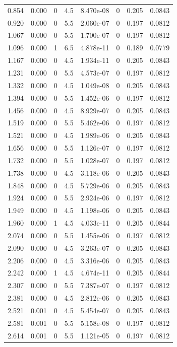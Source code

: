 \documentclass[preview]{standalone}
\begin{document}
{{\begin{tabular}{L{1.2cm}C{1.2cm} C{0.3cm}C{0.5cm} C{1.4cm}C{1.4cm} C{1.4cm}C{1.4cm}}
  0.854  &  0.000  & 0     & 4.5 &  8.470e-08  & 0  & 0.205 &  0.0843   \\ 
  0.920  &  0.000  & 0     & 5.5 &  2.060e-07  & 0  & 0.197 &  0.0812   \\ 
  1.067  &  0.000  & 0     & 5.5 &  1.700e-07  & 0  & 0.197 &  0.0812   \\ 
  1.096  &  0.000  & 1     & 6.5 &  4.878e-11  & 0  & 0.189 &  0.0779   \\ 
  1.167  &  0.000  & 0     & 4.5 &  1.934e-11  & 0  & 0.205 &  0.0843   \\ 
  1.231  &  0.000  & 0     & 5.5 &  4.573e-07  & 0  & 0.197 &  0.0812   \\ 
  1.332  &  0.000  & 0     & 4.5 &  1.049e-08  & 0  & 0.205 &  0.0843   \\ 
  1.394  &  0.000  & 0     & 5.5 &  1.452e-06  & 0  & 0.197 &  0.0812   \\ 
  1.456  &  0.000  & 0     & 4.5 &  8.929e-07  & 0  & 0.205 &  0.0843   \\ 
  1.519  &  0.000  & 0     & 5.5 &  5.462e-06  & 0  & 0.197 &  0.0812   \\ 
  1.521  &  0.000  & 0     & 4.5 &  1.989e-06  & 0  & 0.205 &  0.0843   \\ 
  1.656  &  0.000  & 0     & 5.5 &  1.126e-07  & 0  & 0.197 &  0.0812   \\ 
  1.732  &  0.000  & 0     & 5.5 &  1.028e-07  & 0  & 0.197 &  0.0812   \\ 
  1.738  &  0.000  & 0     & 4.5 &  3.118e-06  & 0  & 0.205 &  0.0843   \\ 
  1.848  &  0.000  & 0     & 4.5 &  5.729e-06  & 0  & 0.205 &  0.0843   \\ 
  1.924  &  0.000  & 0     & 5.5 &  2.924e-06  & 0  & 0.197 &  0.0812   \\ 
  1.949  &  0.000  & 0     & 4.5 &  1.198e-06  & 0  & 0.205 &  0.0843   \\ 
  1.960  &  0.000  & 1     & 4.5 &  4.033e-11  & 0  & 0.205 &  0.0844   \\ 
  2.074  &  0.000  & 0     & 5.5 &  1.455e-06  & 0  & 0.197 &  0.0812   \\ 
  2.090  &  0.000  & 0     & 4.5 &  3.263e-07  & 0  & 0.205 &  0.0843   \\ 
  2.206  &  0.000  & 0     & 4.5 &  3.316e-06  & 0  & 0.205 &  0.0843   \\ 
  2.242  &  0.000  & 1     & 4.5 &  4.674e-11  & 0  & 0.205 &  0.0844   \\ 
  2.307  &  0.000  & 0     & 5.5 &  7.387e-07  & 0  & 0.197 &  0.0812   \\ 
  2.381  &  0.000  & 0     & 4.5 &  2.812e-06  & 0  & 0.205 &  0.0843   \\ 
  2.521  &  0.001  & 0     & 4.5 &  5.454e-07  & 0  & 0.205 &  0.0843   \\ 
  2.581  &  0.001  & 0     & 5.5 &  5.158e-08  & 0  & 0.197 &  0.0812   \\ 
  2.614  &  0.001  & 0     & 5.5 &  1.121e-05  & 0  & 0.197 &  0.0812   \\ 
\hline 
\end{tabular} 

}}
\end{document}

